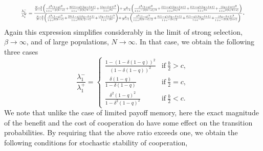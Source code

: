 \documentclass[11pt]{article}
\theoremstyle{plainCl1}
\theoremstyle{plainCl2}
\begin{document}
\begin{equation}
  \resizebox{.9\textwidth}{!}
  {%
$\frac{\lambda^{-}_1}{\lambda^{+}_1} =
\frac{\frac{N - 3}{N-1} \left(\frac{\delta^{2} \left(1-q\right)^{2}}{1 + e^{- \beta \left(b - c\right)}} + \frac{2 \delta \left(1 - q\right) \left(\delta q - \delta + 1\right)}{1 + e^{- \beta \left(b/2 - c\right)}} + \frac{\left(\delta q - \delta + 1\right)^{2}}{1+e^{\beta c}}\right) + \frac{2}{N-1} \left(\frac{\delta^{2} \left(1-q\right)^{2}}{1 + e^{- \beta \left(b - c\right)/2}} + \frac{\delta \left(1 - q\right) \left(\delta q - \delta + 1\right)}{1+e^{\beta c/2} } + \frac{\delta \left(1 - q\right) \left(\delta q - \delta + 1\right)}{1+e^{\beta c} } + \frac{\left(\delta q - \delta + 1\right)^{2}}{1 + e^{ \beta \left( b/2 + c\right)}}\right)}
{\frac{N - 3}{N-1} \left(\frac{\delta^{2} \left(1 - q\right)^{2}}{1 + e^{\beta \left( b - c\right)}} + \frac{2 \delta \left(1 - q\right) \left(\delta q - \delta + 1\right)}{1 + e^{ \beta \left(b/2 - c\right)}} + \frac{\left(\delta q - \delta + 1\right)^{2}}{1 + e^{- \beta c}}\right) 
+ \frac{2}{N-1} \left(\frac{\delta^{2} \left(1 - q\right)^{2}}{1 + e^{ \beta \left(b-c\right)/2}} + \frac{\delta \left(1 - q\right) \left(\delta q - \delta + 1\right)}{1 + e^{- \beta c/2}} + \frac{\delta \left(1 - q\right) \left(\delta q - \delta + 1\right)}{1 + e^{- \beta c}} + \frac{\left(\delta q - \delta + 1\right)^{2}}{1 + e^{- \beta \left(b/2 + c\right)}}\right)}
$} .
\end{equation}
Again this expression simplifies considerably in the limit of strong selection, \(\beta \rightarrow \infty\), and of large
populations, \(N \rightarrow \infty \). In that case, we obtain the following three cases
\begin{equation} \label{Eq:RatioTransitionTwoInteraction}
\frac{\lambda^{-}_1}{\lambda^{+}_1} = 
\begin{cases}
 \frac{1-(1-\delta(1-q))^2}{(1-\delta(1-q))^2} &\text{if}~ \frac{b}{2} > c , \\[0.2cm]
  \frac{\delta(1-q)}{1-\delta(1-q)}  &\text{if}~ \frac{b}{2} = c , \\[0.2cm]
  \frac{\delta^2(1-q)^2}{1-\delta^2(1-q)^2} &\text{if}~\frac{b}{2} < c .
\end{cases}
\end{equation}
We note that unlike the case of limited payoff memory, here the exact magnitude of the benefit and the cost of cooperation do have some effect on the transition probabilities. 
By requiring that the above ratio exceeds one, we obtain the following conditions for stochastic stability of cooperation, 
\end{document}
